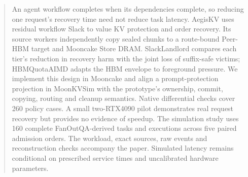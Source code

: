 \begin{abstract}
An agent workflow completes when its dependencies complete, so reducing one
request's recovery time need not reduce task latency. AegisKV uses residual
workflow Slack to value KV protection and order recovery. Its source workers
independently copy sealed chunks to a route-bound Peer-HBM target and Mooncake
Store DRAM. SlackLandlord compares each tier's reduction in recovery harm with
the joint loss of suffix-safe victims; HBMQuotaAIMD adapts the HBM envelope to
foreground pressure. We implement this design in Mooncake and align a
prompt-protection projection in MoonKVSim with the prototype's ownership,
commit, copying, routing and cleanup semantics. Native differential checks
cover 260 policy cases. A small two-RTX4090 pilot demonstrates real request
recovery but provides no evidence of speedup. The simulation study uses 160
complete FanOutQA-derived tasks and \MeasuredRuns{} executions across five
paired admission orders. \AbstractResults{}
The workload, exact sources, raw events and reconstruction checks accompany
the paper. Simulated latency remains conditional on prescribed service times
and uncalibrated hardware parameters.
\end{abstract}
